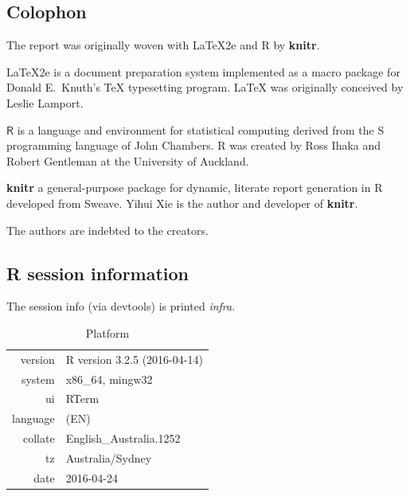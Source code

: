\begin{subappendices}
\chapter{Colophon}
The report was originally woven with \LaTeX2e and R by \textbf{knitr}. 

\LaTeX2e{} is a document preparation system implemented as a macro package for Donald E.\ Knuth's \TeX{} typesetting program. \LaTeX{} was originally conceived by Leslie Lamport. 

$\mathsf{R}$ is a language and environment for statistical computing derived from the S programming language of John Chambers. R was created by Ross Ihaka and Robert Gentleman at the University of Auckland. 

\textbf{knitr} a general-purpose package for dynamic, literate report generation in R developed from Sweave. Yihui Xie is the author and developer of \textbf{knitr}. 

The authors are indebted to the creators.

\section{R session information}
The session info (via devtools) is printed \emph{infra}.



\begin{table}[!htb]
\centering
\captionsetup{justification=centering}
\caption{Platform}
\begin{tabular}{rl}
  \toprule
 version & R version 3.2.5 (2016-04-14) \\ 
  system & x86\_64, mingw32 \\ 
  ui & RTerm \\ 
  language & (EN) \\ 
  collate & English\_Australia.1252 \\ 
  tz & Australia/Sydney \\ 
  date & 2016-04-24 \\ 
   \bottomrule
\end{tabular}

\end{table}

\onecolumn



\end{subappendices}
